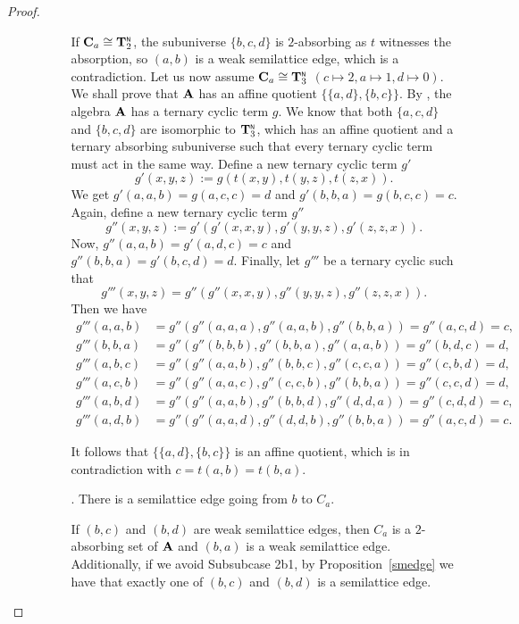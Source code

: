 \documentclass[11pt]{amsart}
\newcommand{\m}[1]{\mathbf{\uppercase{#1}}}
\newcommand{\n}{\scriptscriptstyle{\mathsf{N}}}
\theoremstyle{definition}
\theoremstyle{remark}
\theoremstyle{plain}
\begin{document}
\begin{proof}
\begin{enumerate}[wide, labelwidth=!,itemindent=!,labelindent=0pt]
\begin{enumerate}[wide, labelwidth=!,labelindent=0pt,itemindent=!]
\begin{enumerate}[wide, labelwidth=!,labelindent=0pt,itemindent=!]
 If $\m C_a\cong{\m T}_2^{\n}$, the subuniverse $\{b,c,d\}$ is $2$-absorbing as $t$ witnesses the absorption, so $(a,b)$ is a weak semilattice edge, which is a contradiction. Let us now assume $\m C_a\cong {\m T}_3^{\n}$ $(c\mapsto 2, a\mapsto 1, d\mapsto 0)$. We shall prove that ${\m A}$ has an affine quotient $\{\{a,d\},\{b,c\}\}$. By , the algebra ${\m A}$ has a ternary cyclic term $g$. We know that both $\{a,c,d\}$ and $\{b,c,d\}$ are isomorphic to ${\m T}_3^{\n}$, which has an affine quotient and a ternary absorbing subuniverse such that every ternary cyclic term must act in the same way. Define a new ternary cyclic term $g'$
$$g'(x,y,z) := g(t(x,y),t(y,z),t(z,x)).$$
We get $g'(a,a,b)=g(a,c,c)=d$ and $g'(b,b,a)=g(b,c,c)=c$. Again, define a new ternary cyclic term $g''$
$$g''(x,y,z) := g'(g'(x,x,y),g'(y,y,z),g'(z,z,x)).$$
Now, $g''(a,a,b)=g'(a,d,c)=c$ and $g''(b,b,a)=g'(b,c,d)=d$. Finally, let $g'''$ be a ternary cyclic such that
$$g'''(x,y,z) = g''(g''(x,x,y),g''(y,y,z),g''(z,z,x)).$$
Then we have 
\begin{align*}
g'''(a,a,b)&=g''(g''(a,a,a),g''(a,a,b),g''(b,b,a))=g''(a,c,d)=c,\\
g'''(b,b,a)&=g''(g''(b,b,b),g''(b,b,a),g''(a,a,b))=g''(b,d,c)=d,\\
g'''(a,b,c)&=g''(g''(a,a,b),g''(b,b,c),g''(c,c,a))=g''(c,b,d)=d,\\
g'''(a,c,b)&=g''(g''(a,a,c),g''(c,c,b),g''(b,b,a))=g''(c,c,d)=d,\\
g'''(a,b,d)&=g''(g''(a,a,b),g''(b,b,d),g''(d,d,a))=g''(c,d,d)=c,\\
g'''(a,d,b)&=g''(g''(a,a,d),g''(d,d,b),g''(b,b,a))=g''(a,c,d)=c.
\end{align*}

It follows that $\{\{a,d\},\{b,c\}\}$ is an affine quotient, which is in contradiction with $c=t(a,b)=t(b,a)$.


\item[\sc{Subsubcase 2b2}.] There is a semilattice edge going from $b$ to $C_a$.

If $(b,c)$ and $(b,d)$ are weak semilattice edges, then $C_a$ is a $2$-absorbing set of ${\m A}$ and $(b,a)$ is a weak semilattice edge. Additionally, if we avoid {\sc Subsubcase 2b1}, by Proposition~\ref{smedge} we have that exactly one of $(b,c)$ and $(b,d)$ is a semilattice edge.


\end{enumerate}
\end{enumerate}
\end{enumerate}
\end{proof}
\end{document}
